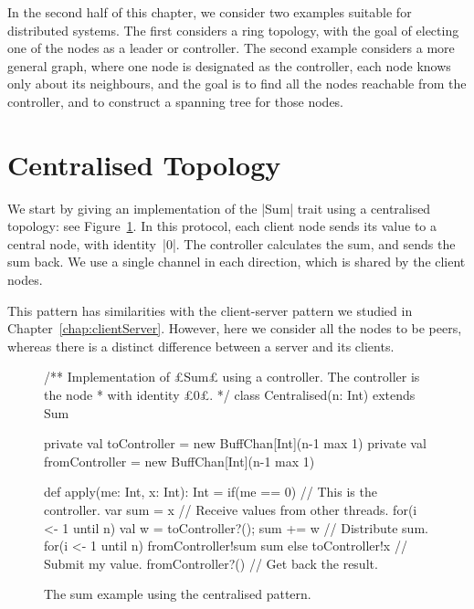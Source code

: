 In the second half of this chapter, we consider two examples suitable for
distributed systems.  The first considers a ring topology, with the goal of
electing one of the nodes as a leader or controller.  The second example
considers a more general graph, where one node is designated as the
controller, each node knows only about its neighbours, and the goal is to find
all the nodes reachable from the controller, and to construct a spanning tree
for those nodes.


\section{Centralised Topology}

We start by giving an implementation of the |Sum| trait using a centralised
topology: see Figure~\ref{fig:sum-centralised}.  In
this protocol, each client node sends its value to a central node, with
identity~|0|.  The controller calculates the sum, and sends the sum back.  We
use a single channel in each direction, which is shared by the client nodes.

This pattern has similarities with the client-server pattern we studied in
Chapter~\ref{chap:clientServer}.  However, here we consider all the nodes to
be peers, whereas there is a distinct difference between a server and its
clients. 


\begin{figure}[bht]
\begin{scala}
/** Implementation of £Sum£ using a controller.  The controller is the node
  * with identity £0£. */
class Centralised(n: Int) extends Sum{
  private val toController = new BuffChan[Int](n-1 max 1)
  private val fromController = new BuffChan[Int](n-1 max 1)

  def apply(me: Int, x: Int): Int = {
    if(me == 0){ // This is the controller.
      var sum = x
      // Receive values from other threads.
      for(i <- 1 until n){ val w = toController?(); sum += w }
      // Distribute sum.
      for(i <- 1 until n) fromController!sum
      sum
    }
    else{
      toController!x     // Submit my value.
      fromController?() // Get back the result.
    }
  }
}
\end{scala}
\caption{The sum example using the centralised pattern.}
\label{fig:sum-centralised}
\end{figure}

